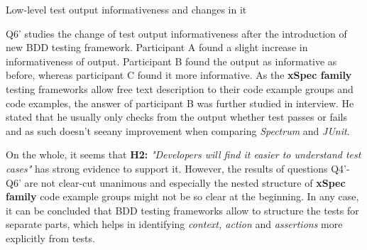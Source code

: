     \begin{table}[H]
            \caption {Low-level test output informativeness and changes in it} \label{tab:changes-pt5}
    \end{table}

Q6' studies the change of test output informativeness after the introduction of new BDD testing framework. Participant A
found a slight increase in informativeness of output. Participant B found the output as informative as before, whereas participant
C found it more informative. As the \textbf{xSpec family} testing frameworks allow free text description to their
code example groups and code examples, the answer of participant B was further studied in interview. He stated that
he usually only checks from the output whether test passes or fails and as such doesn't see\noindent any improvement when
comparing \textit{Spectrum} and \textit{JUnit}.

On the whole, it seems that \textbf{H2:} \textit{"Developers will find it easier to understand test cases"} has strong
evidence to support it. However, the results of questions Q4'-Q6' are not clear-cut unanimous and especially the nested structure of \textbf{xSpec family}
code example groups might not be so clear at the beginning. In any case, it can be concluded that BDD testing
frameworks allow to structure the tests for separate parts, which helps in identifying \textit{context, action}
and \textit{assertions} more explicitly from tests.

